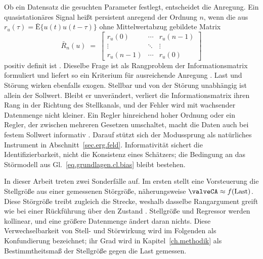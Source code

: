 Ob ein Datensatz die gesuchten Parameter festlegt, entscheidet die
Anregung. Ein quasistationäres Signal heißt persistent anregend der
Ordnung $n$, wenn die aus $r_u(\tau) = \bar{\mathrm{E}}\{u(t)u(t-\tau)\}$
ohne Mittelwertabzug gebildete Matrix
\begin{equation}
  \label{eq.grundlagen.cl.pe}
  \bar{R}_n(u) \;=\;
  \begin{bmatrix}
    r_u(0)   & \cdots & r_u(n-1) \\
    \vdots   & \ddots & \vdots   \\
    r_u(n-1) & \cdots & r_u(0)
  \end{bmatrix}
\end{equation}
positiv definit ist \cite[Kap.~13]{ljungSystemIdentificationTheory1999}.
Dieselbe Frage ist als Rangproblem der Informationsmatrix formuliert und
liefert so ein Kriterium für ausreichende Anregung
\cite{geversIdentificationInformationMatrix2009}. Last und Störung
wirken ebenfalls exogen. Stellbar und von der Störung unabhängig ist
allein der Sollwert. Bleibt er unverändert, verliert die
Informationsmatrix ihren Rang in der Richtung des Stellkanals, und der
Fehler wird mit wachsender Datenmenge nicht kleiner.
Ein Regler hinreichend hoher Ordnung oder ein Regler, der zwischen
mehreren Gesetzen umschaltet, macht die Daten auch bei festem Sollwert
informativ \cite[Abschn.~13.4]{ljungSystemIdentificationTheory1999}.
Darauf stützt sich der Modussprung als natürliches Instrument in
Abschnitt~\ref{sec.erg.feld}. Informativität sichert die
Identifizierbarkeit, nicht die Konsistenz eines Schätzers; die Bedingung
an das Störmodell aus Gl.~\eqref{eq.grundlagen.cl.bias} bleibt bestehen.

In dieser Arbeit treten zwei Sonderfälle auf. Im ersten stellt
eine Vorsteuerung die Stellgröße aus einer gemessenen Störgröße,
näherungsweise $\valveCA \approx f(\text{Last})$. Diese Störgröße treibt
zugleich die Strecke, weshalb dasselbe Rangargument greift wie bei einer
Rückführung über den Zustand
\cite{proctorGeneralizingKoopmanTheory2018}. Stellgröße und Regressor
werden kollinear, und eine größere Datenmenge ändert daran nichts.
Diese Verwechselbarkeit von Stell- und Störwirkung wird im Folgenden
als Konfundierung bezeichnet; ihr Grad wird in
Kapitel~\ref{ch.methodik} als Bestimmtheitsmaß der Stellgröße gegen
die Last gemessen.


